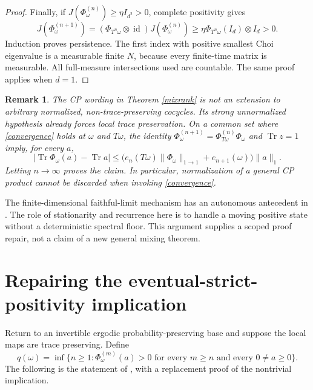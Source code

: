 \documentclass[11pt,a4paper]{article}
\newtheorem{remark}[theorem]{Remark}
\newcommand{\tr}{\operatorname{Tr}}
\newcommand{\id}{\operatorname{id}}
\begin{document}
\begin{proof}
Finally, if $J(\Phi^{(n)}_\omega)\geq\eta I_{d^2}>0$, complete positivity gives
\[
 J(\Phi^{(n+1)}_\omega)
 =(\Phi_{T^n\omega}\otimes\id)J(\Phi^{(n)}_\omega)
 \geq\eta\Phi_{T^n\omega}(I_d)\otimes I_d>0.
\]
Induction proves persistence. The first index with positive smallest Choi eigenvalue is a measurable finite $N$, because every finite-time matrix is measurable. All full-measure intersections used are countable. The same proof applies when $d=1$.
\end{proof}

\begin{remark}\label{forcedtp}
The CP wording in Theorem \ref{mixrank} is not an extension to arbitrary normalized, non-trace-preserving cocycles. Its strong \emph{unnormalized} hypothesis already forces local trace preservation. On a common set where \eqref{convergence} holds at $\omega$ and $T\omega$, the identity
$\Phi^{(n+1)}_\omega=\Phi^{(n)}_{T\omega}\Phi_\omega$ and $\tr z=1$ imply, for every $a$,
\[
 |\tr\Phi_\omega(a)-\tr a|
 \leq\bigl(e_n(T\omega)\|\Phi_\omega\|_{1\to1}+e_{n+1}(\omega)\bigr)\|a\|_1.
\]
Letting $n\to\infty$ proves the claim. In particular, normalization of a general CP product cannot be discarded when invoking \eqref{convergence}.
\end{remark}

The finite-dimensional faithful-limit mechanism has an autonomous antecedent in \cite[Proposition 3(c)$\Rightarrow$(b)]{SW}. The role of stationarity and recurrence here is to handle a moving positive state without a deterministic spectral floor. This argument supplies a scoped proof repair, not a claim of a new general mixing theorem.

\section{Repairing the eventual-strict-positivity implication}\label{repair}
Return to an invertible ergodic probability-preserving base and suppose the local maps are trace preserving. Define
\[
 q(\omega)=\inf\{n\geq1:\Phi^{(m)}_\omega(a)>0
 \text{ for every }m\geq n\text{ and every }0\neq a\geq0\}.
\]
The following is the statement of \cite[Proposition A.9]{EMPS}, with a replacement proof of the nontrivial implication.
\end{document}
